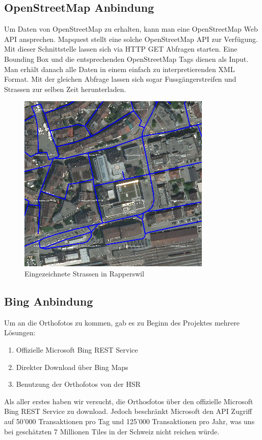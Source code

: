 \subsection{OpenStreetMap Anbindung}
Um Daten von OpenStreetMap zu erhalten, kann man eine OpenStreetMap Web API ansprechen. Mapquest \cite{Mapquest} stellt eine solche OpenStreetMap API zur Verfügung. Mit dieser Schnittstelle lassen sich via HTTP GET Abfragen starten. Eine Bounding Box und die entsprechenden OpenStreetMap Tags dienen als Input. Man erhält danach alle Daten in einem einfach zu interpretierenden XML Format. Mit der gleichen Abfrage lassen sich sogar Fussgängerstreifen und Strassen zur selben Zeit herunterladen. \\

\begin{figure}[H]
	\centering
	\includegraphics{images/Strassen_Rapperswil.png}
	\caption{Eingezeichnete Strassen in Rapperswil}
\end{figure}

\newpage
\subsection{Bing Anbindung}
Um an die Orthofotos zu kommen, gab es zu Beginn des Projektes mehrere Lösungen:
\begin{enumerate}
	\item Offizielle Microsoft Bing REST Service
	\item Direkter Download über Bing Maps
	\item Benutzung der Orthofotos von der HSR
\end{enumerate}

Als aller erstes haben wir versucht, die Orthosfotos über den offizielle Microsoft Bing REST Service \cite{BingMapsRest} zu download. Jedoch beschränkt Microsoft den API Zugriff auf 50'000 Transaktionen pro Tag und 125'000 Transaktionen pro Jahr, was uns bei geschätzten 7 Millionen Tiles in der Schweiz nicht reichen würde.

